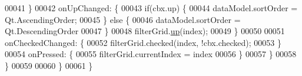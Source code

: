 \begin{DoxyCode}
00041                 \}
00042                 onUpChanged: \{
00043                     \textcolor{keywordflow}{if}(cbx.up) \{
00044                         dataModel.sortOrder = Qt.AscendingOrder;
00045                     \} \textcolor{keywordflow}{else} \{
00046                         dataModel.sortOrder = Qt.DescendingOrder
00047                     \}
00048                     filterGrid.\hyperlink{classSH__TriStateCheckImage_a8a6a37f71149d3f918f642fa9d3e432c}{up}(index);
00049                 \}
00050 
00051                 onCheckedChanged: \{
00052                     filterGrid.checked(index, !cbx.checked);
00053                 \}
00054                 onPressed: \{
00055                     filterGrid.currentIndex = index
00056                 \}
00057             \}
00058         \}
00059 
00060     \}
00061 \}
\end{DoxyCode}
